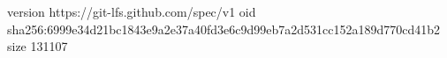 version https://git-lfs.github.com/spec/v1
oid sha256:6999e34d21bc1843e9a2e37a40fd3e6c9d99eb7a2d531cc152a189d770cd41b2
size 131107
